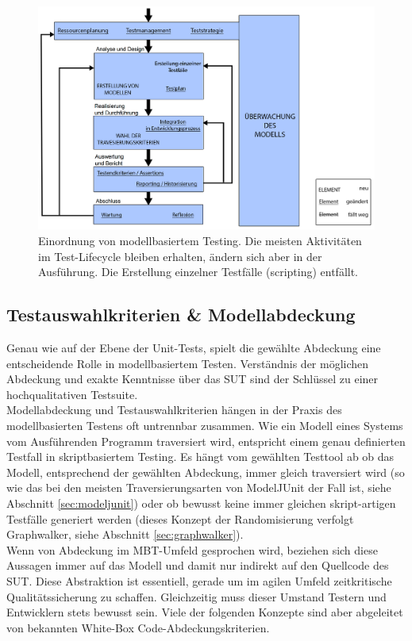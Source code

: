 \begin{figure}[h] 
  \centering
     \includegraphics[width=1.0\textwidth]{figures/mbt_vergleich_skript.png}
  \caption{Einordnung von modellbasiertem Testing. Die meisten Aktivitäten im Test-Lifecycle bleiben erhalten, ändern sich aber in der Ausführung. Die Erstellung einzelner Testfälle (scripting) entfällt.}
  \label{fig:script_vs_mbt}
\end{figure}

\subsection{Testauswahlkriterien \& Modellabdeckung}
\label{sec:coverage}

Genau wie auf der Ebene der Unit-Tests, spielt die gewählte Abdeckung eine entscheidende Rolle in modellbasiertem Testen. Verständnis der möglichen Abdeckung und exakte Kenntnisse über das SUT sind der Schlüssel zu einer hochqualitativen Testsuite.\\
Modellabdeckung und Testauswahlkriterien hängen in der Praxis des modellbasierten Testens oft untrennbar zusammen. Wie ein Modell eines Systems vom Ausführenden Programm traversiert wird, entspricht einem genau definierten Testfall in skriptbasiertem Testing. Es hängt vom gewählten Testtool ab ob das Modell, entsprechend der gewählten Abdeckung, immer gleich traversiert wird (so wie das bei den meisten Traversierungsarten von ModelJUnit der Fall ist, siehe Abschnitt \ref{sec:modeljunit}) oder ob bewusst keine immer gleichen skript-artigen Testfälle generiert werden (dieses Konzept der Randomisierung verfolgt Graphwalker, siehe Abschnitt \ref{sec:graphwalker}).\\
Wenn von Abdeckung im MBT-Umfeld gesprochen wird, beziehen sich diese Aussagen immer auf das Modell und damit nur indirekt auf den Quellcode des SUT. Diese Abstraktion ist essentiell, gerade um im agilen Umfeld zeitkritische Qualitätssicherung zu schaffen.\cite{utting_practical_2007} Gleichzeitig muss dieser Umstand Testern und Entwicklern stets bewusst sein. Viele der folgenden Konzepte sind aber abgeleitet von bekannten White-Box Code-Abdeckungskriterien.

